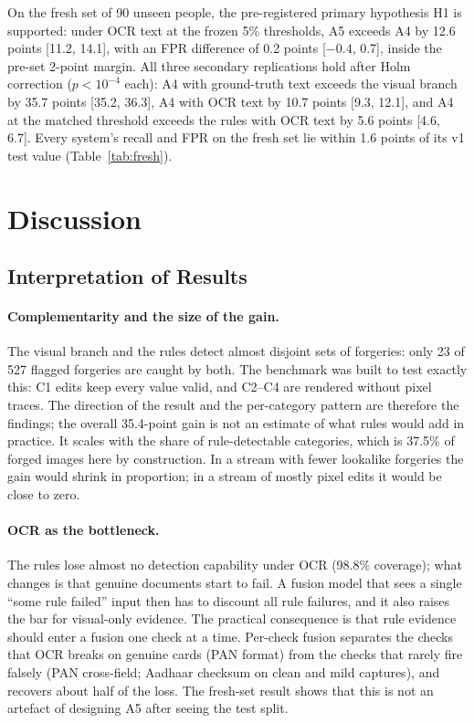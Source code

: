 \documentclass[12pt]{article}
\begin{document}
On the fresh set of 90 unseen people, the pre-registered primary
hypothesis H1 is supported: under OCR text at the frozen 5\% thresholds,
A5 exceeds A4 by 12.6 points [11.2, 14.1], with an FPR difference of
0.2 points [$-0.4$, 0.7], inside the pre-set 2-point margin. All three
secondary replications hold after Holm correction ($p<10^{-4}$ each): A4
with ground-truth text exceeds the visual branch by 35.7 points [35.2,
36.3], A4 with OCR text by 10.7 points [9.3, 12.1], and A4 at the
matched threshold exceeds the rules with OCR text by 5.6 points [4.6,
6.7]. Every system's recall and FPR on the fresh set lie within 1.6
points of its v1 test value (Table~\ref{tab:fresh}).

\section{Discussion}
\label{sec:discussion}

\subsection{Interpretation of Results}
\label{subsec:interpretation}

\paragraph*{Complementarity and the size of the gain.} The visual branch and the
rules detect almost disjoint sets of forgeries: only 23 of 527 flagged
forgeries are caught by both. The benchmark was built to test exactly
this: C1 edits keep every value valid, and C2--C4 are rendered without
pixel traces. The direction of the result and the per-category
pattern are therefore the findings; the overall 35.4-point gain is not
an estimate of what rules would add in practice. It scales with the
share of rule-detectable categories, which is 37.5\% of forged images
here by construction. In a stream with fewer lookalike forgeries the
gain would shrink in proportion; in a stream of mostly pixel edits it
would be close to zero.

\paragraph*{OCR as the bottleneck.} The
rules lose almost no detection capability under OCR (98.8\% coverage);
what changes is that genuine documents start to fail. A fusion model
that sees a single ``some rule failed'' input then has to discount all
rule failures, and it also raises the bar for visual-only evidence. The
practical consequence is that rule evidence should enter a fusion one
check at a time. Per-check fusion separates the checks that OCR breaks
on genuine cards (PAN format) from the checks that rarely fire falsely
(PAN cross-field; Aadhaar checksum on clean and mild captures), and recovers
about half of the loss. The fresh-set result shows that this is not an
artefact of designing A5 after seeing the test split.
\end{document}
